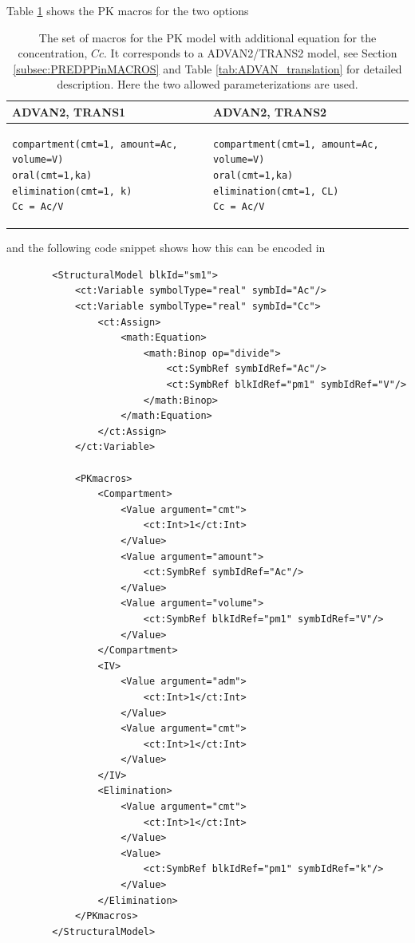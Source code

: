 Table \ref{tab:ADVAN2TRANS1reparameterisation} shows the PK macros for the two options
\begin{table}[ht]
\centering
\renewcommand{\arraystretch}{1.1}%
\begin{tabular*}{.9\textwidth}{@{\extracolsep{\fill} } ll}
  \hline
  \hline
ADVAN2, TRANS1 & ADVAN2, TRANS2 \\
  \hline
\lstset{language=NONMEMdataSet}
\begin{lstlisting}
compartment(cmt=1, amount=Ac, volume=V)
oral(cmt=1,ka)
elimination(cmt=1, k)
Cc = Ac/V
\end{lstlisting}
&
\lstset{language=NONMEMdataSet}
\begin{lstlisting}
compartment(cmt=1, amount=Ac, volume=V)
oral(cmt=1,ka)
elimination(cmt=1, CL)
Cc = Ac/V
\end{lstlisting}
\end{tabular*}
\caption{The set of macros for the PK model with additional equation for the 
concentration, $Cc$. It corresponds to a ADVAN2/TRANS2 model, see 
Section \ref{subsec:PREDPPinMACROS} and Table \ref{tab:ADVAN_translation} 
for detailed description. Here the two allowed parameterizations are used.}
\label{tab:ADVAN2TRANS1reparameterisation}
\end{table}
and the following code snippet shows how this can be encoded in \pml
\lstset{language=XML}
\begin{lstlisting}
        <StructuralModel blkId="sm1">
            <ct:Variable symbolType="real" symbId="Ac"/>
            <ct:Variable symbolType="real" symbId="Cc">
                <ct:Assign>
                    <math:Equation>
                        <math:Binop op="divide">
                            <ct:SymbRef symbIdRef="Ac"/>
                            <ct:SymbRef blkIdRef="pm1" symbIdRef="V"/>
                        </math:Binop>
                    </math:Equation>
                </ct:Assign>
            </ct:Variable>
            
            <PKmacros>
                <Compartment>
                    <Value argument="cmt">
                        <ct:Int>1</ct:Int>
                    </Value>
                    <Value argument="amount">
                        <ct:SymbRef symbIdRef="Ac"/>
                    </Value>
                    <Value argument="volume">
                        <ct:SymbRef blkIdRef="pm1" symbIdRef="V"/>
                    </Value>
                </Compartment>
                <IV>
                    <Value argument="adm">
                        <ct:Int>1</ct:Int>
                    </Value>
                    <Value argument="cmt">
                        <ct:Int>1</ct:Int>
                    </Value>
                </IV>
                <Elimination>
                    <Value argument="cmt">
                        <ct:Int>1</ct:Int>
                    </Value>
                    <Value>
                        <ct:SymbRef blkIdRef="pm1" symbIdRef="k"/>
                    </Value>
                </Elimination>
            </PKmacros>
        </StructuralModel>
\end{lstlisting}
